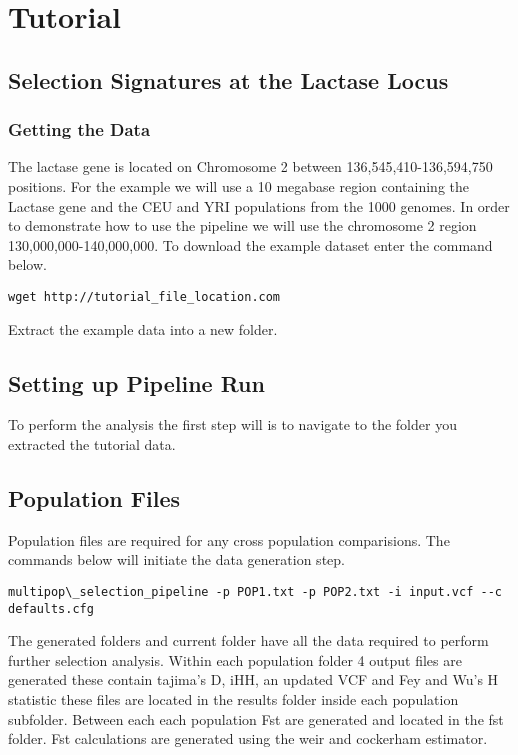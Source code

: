 \documentclass[a4paper,10pt]{article}
\begin{document}
\section{Tutorial}
\subsection{Selection Signatures at the Lactase Locus}
\subsubsection{Getting the Data}
The lactase gene is located on Chromosome 2 between 136,545,410-136,594,750 positions. For the example we will use a 10 megabase region containing the Lactase gene and the CEU and YRI populations from the 1000 genomes. In order to demonstrate how to use the pipeline we will use the chromosome 2 region 130,000,000-140,000,000. To download the example dataset enter the command below. \\

\begin{verbatim}
wget http://tutorial_file_location.com 
\end{verbatim}

Extract the example data into a new folder.

\subsection{Setting up Pipeline Run}
To perform the analysis the first step will is to navigate to the folder you extracted the tutorial data.
\subsection{Population Files}
Population files are required for any cross population comparisions. The commands below will initiate the data generation step.\\
\begin{verbatim}
multipop\_selection_pipeline -p POP1.txt -p POP2.txt -i input.vcf --c defaults.cfg
\end{verbatim}
The generated folders and current folder have all the data required to perform further selection analysis. Within each population folder 4 output files are generated these contain tajima's D, iHH, an updated VCF and Fey and Wu's H statistic these files are located in the results folder inside each population subfolder. Between each each population Fst are generated and located in the fst folder. Fst calculations are generated using the weir and cockerham estimator.
\end{document}
